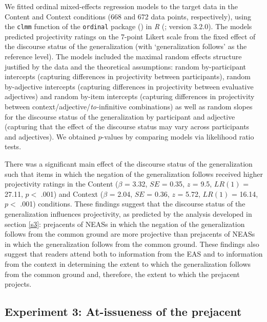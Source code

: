\documentclass[11pt,fleqn]{article}
\newcommand{\6}{\mbox{$[\hspace*{-.6mm}[$}}
\newcommand{\9}{\mbox{$]\hspace*{-.6mm}]$}}
\begin{document}
We fitted ordinal mixed-effects regression models to the target data in the Content and Context conditions (668 and 672 data points, respectively), using the {\tt clmm} function of the {\tt ordinal} package (\citealt{Christensen2013}) in {\em R} (\citealt{r}; version 3.2.0). The models predicted projectivity ratings on the 7-point Likert scale from the fixed effect of the discourse status of the generalization (with `generalization follows' as the reference level). The models included the maximal random effects structure justified by the data and the theoretical assumptions: random by-participant intercepts (capturing differences in projectivity between participants), random by-adjective intercepts (capturing differences in projectivity between evaluative adjectives) and random by-item intercepts (capturing differences in projectivity between context/adjective/{\em to-}infinitive combinations) as well as random slopes for the discourse status of the generalization by participant and adjective (capturing that the effect of the discourse status may vary across participants and adjectives). We obtained $p$-values by comparing models via likelihood ratio tests.

There was a significant main effect of the discourse status of the generalization such that items in which the negation of the generalization follows received higher projectivity ratings in the Content ($\beta$ = 3.32, $SE$ = 0.35, $z$ = 9.5, $LR(1)$ = 27.11, $p <$ .001) and Context ($\beta$ = 2.04, $SE$ = 0.36, $z$ = 5.72, $LR(1)$ = 16.14, $p <$ .001) conditions. These findings suggest that the discourse status of the generalization influences projectivity, as predicted by the analysis developed in section \ref{s3}: prejacents of NEASs in which the negation of the generalization follows from the common ground are more projective than prejacents of NEASs in which the generalization follows from the common ground. These findings also suggest that readers attend both to information from the EAS and to information from the context in determining the extent to which the generalization follows from the common ground and, therefore, the extent to which the prejacent projects.

\subsection{Experiment 3: At-issueness of the prejacent}\label{s43}
\end{document}
